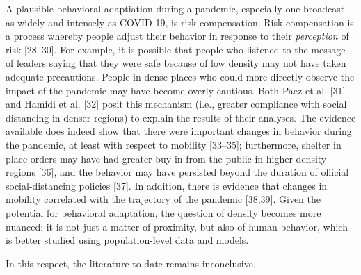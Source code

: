 \documentclass[10pt,letterpaper]{article}
\begin{document}
A plausible behavioral adaptiation during a pandemic, especially one
broadcast as widely and intensely as COVID-19, is risk compensation.
Risk compensation is a process whereby people adjust their behavior in
response to their \emph{perception} of risk {[}28--30{]}. For example,
it is possible that people who listened to the message of leaders saying
that they were safe because of low density may not have taken adequate
precautions. People in dense places who could more directly observe the
impact of the pandemic may have become overly cautious. Both Paez et al.
{[}31{]} and Hamidi et al. {[}32{]} posit this mechanism (i.e., greater
compliance with social distancing in denser regions) to explain the
results of their analyses. The evidence available does indeed show that
there were important changes in behavior during the pandemic, at least
with respect to mobility {[}33--35{]}; furthermore, shelter in place
orders may have had greater buy-in from the public in higher density
regions {[}36{]}, and the behavior may have persisted beyond the
duration of official social-distancing policies {[}37{]}. In addition,
there is evidence that changes in mobility correlated with the
trajectory of the pandemic {[}38,39{]}. Given the potential for
behavioral adaptation, the question of density becomes more nuanced: it
is not just a matter of proximity, but also of human behavior, which is
better studied using population-level data and models.

In this respect, the literature to date remains inconclusive.
\end{document}
